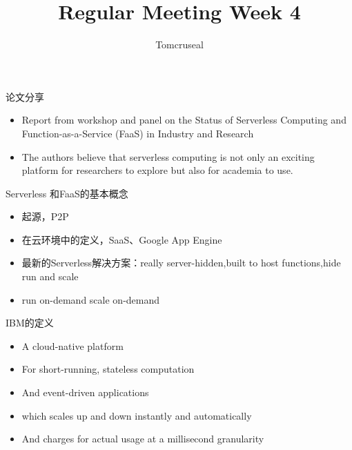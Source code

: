 \documentclass{beamer}
\author{Tomcruseal}
\title{Regular Meeting Week 4}
\institute{School of Computer Science and Technology SCUT }
\begin{document}
	
	\frame{\titlepage}
	



    
    \begin{frame}论文分享
    	\begin{itemize}
    		\item Report from workshop and panel on the Status of
    		Serverless Computing and Function-as-a-Service
    		(FaaS) in Industry and Research
    	\end{itemize}
        
    \end{frame}
    
    \begin{frame}
    	\begin{itemize}
    		\item The authors believe that serverless computing is not only an exciting platform for researchers
    		to explore but also for academia to use.
    	
        \end{itemize}
    \end{frame}

    \begin{frame}Serverless 和FaaS的基本概念
        \begin{itemize}
        	\item 起源，P2P
        	\item 在云环境中的定义，SaaS、Google App Engine
        	\item 最新的Serverless解决方案：really server-hidden,built to host functions,hide run and scale
        	\item run on-demand scale on-demand
        	
        \end{itemize}
    \end{frame}

    \begin{frame}IBM的定义
    	\begin{itemize}
    	    \item A cloud-native platform
    	    \item For short-running, stateless computation
    	    \item And event-driven applications
    	    \item which scales up and down instantly and
    	    automatically
    	    \item And charges for actual usage at a
    	    millisecond granularity
    	\end{itemize}
        
    \end{frame}
\end{document}
